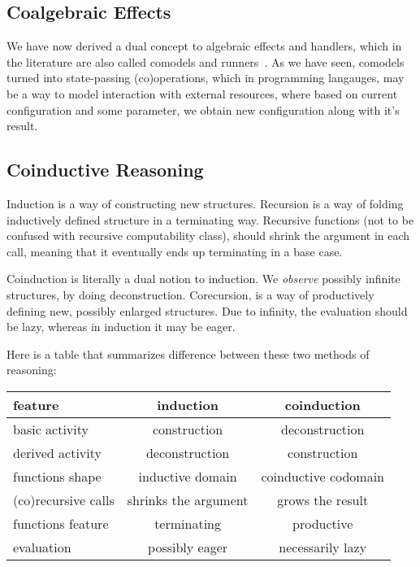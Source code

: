 \documentclass[declaration,shortabstract]{iithesis}
\theoremstyle{definition} \newtheorem{definition}{Definition}[chapter]
\theoremstyle{remark} \newtheorem{remark}[definition]{Observation}
\theoremstyle{plain} \newtheorem{theorem}[definition]{Theorem}
\theoremstyle{plain} \newtheorem{lemma}[definition]{Lemma}
\begin{document}
    \subsection{Coalgebraic Effects}

    We have now derived a dual concept to algebraic effects and handlers, which
    in the literature are also called comodels and runners~\cite{runners-uustalu, runners-in-action}.
    As we have seen, comodels turned into state-passing (co)operations, which
    in programming langauges, may be a way to model interaction with external
    resources, where based on current configuration and some parameter, we
    obtain new configuration along with it's result.

    \subsection{Coinductive Reasoning}\label{subsec:coinduction}

    Induction is a way of constructing new structures. Recursion is a way of
    folding inductively defined structure in a terminating way. Recursive
    functions (not to be confused with recursive computability class), should
    shrink the argument in each call, meaning that it eventually ends up
    terminating in a base case.

    Coinduction is literally a dual notion to induction. We \textit{observe} possibly
    infinite structures, by doing deconstruction. Corecursion, is a way
    of productively defining new, possibly enlarged structures. Due to infinity,
    the evaluation should be lazy, whereas in induction it may be eager.

    Here is a table that summarizes difference between these two methods of reasoning:

    \begin{center}
    \begin{tabular}{lcc}
    \toprule

    \textbf{feature}             & \textbf{induction}            & \textbf{coinduction}          \\
    \midrule

    basic activity      & construction          & deconstruction \\
    \midrule

    derived activity    & deconstruction       & construction         \\
    \midrule

    functions shape     & inductive domain     & coinductive codomain \\
    \midrule

    (co)recursive calls& shrinks the argument & grows the result     \\
    \midrule

    functions feature   & terminating          & productive           \\
    \midrule

    evaluation          & possibly eager       & necessarily lazy     \\
    \bottomrule

    \end{tabular}
    \end{center}
\end{document}
